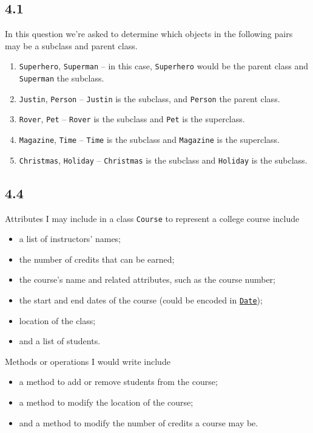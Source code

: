 \documentclass[leqno, 11pt]{article}
\begin{document}
\subsection{4.1}
In this question we're asked to determine which objects in the following pairs may be a subclass and parent class.
\begin{enumerate}[label=\alph*.]
  \itemsep-0.2em
  \item \texttt{Superhero}, \texttt{Superman} -- in this case, \texttt{Superhero} would be the parent class and \texttt{Superman} the subclass.
  \item \texttt{Justin}, \texttt{Person} -- \texttt{Justin} is the subclass, and \texttt{Person} the parent class.
  \item \texttt{Rover}, \texttt{Pet} -- \texttt{Rover} is the subclass and \texttt{Pet} is the superclass.
  \item \texttt{Magazine}, \texttt{Time} -- \texttt{Time} is the subclass and \texttt{Magazine} is the superclass.
  \item \texttt{Christmas}, \texttt{Holiday} -- \texttt{Christmas} is the subclass and \texttt{Holiday} is the subclass.
\end{enumerate}
\subsection{4.4}
Attributes I may include in a class \texttt{Course} to represent a college course include
\begin{itemize}
  \itemsep-0.2em
  \item a list of instructors' names;
  \item the number of credits that can be earned;
  \item the course's name and related attributes, such as the course number;
  \item the start and end dates of the course (could be encoded in \href{https://docs.oracle.com/javase/10/docs/api/java/sql/Date.html}{\texttt{Date}});
  \item location of the class;
  \item and a list of students.
\end{itemize}
Methods or operations I would write include
\begin{itemize}
  \itemsep-0.2em
  \item a method to add or remove students from the course;
  \item a method to modify the location of the course;
  \item and a method to modify the number of credits a course may be.
\end{itemize}
\end{document}
